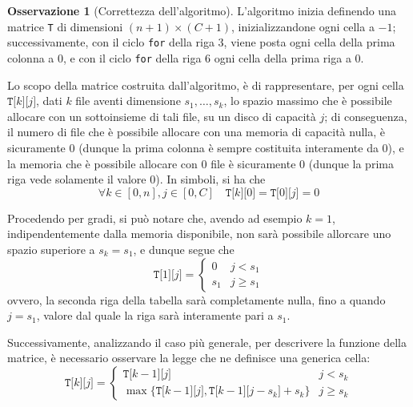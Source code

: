 \documentclass[14pt]{extreport}
\theoremstyle{definition}
\theoremstyle{definition}
\newtheorem{remark}{Osservazione}[subsection]
\begin{document}
\begin{remark}[Correttezza dell'algoritmo]
    L'algoritmo inizia definendo una matrice \texttt{T} di dimensioni $(n + 1) \times (C + 1)$, inizializzandone ogni cella a $-1$; successivamente, con il ciclo \texttt{for} della riga 3, viene posta ogni cella della prima colonna a 0, e con il ciclo \texttt{for} della riga 6 ogni cella della prima riga a 0.

    Lo scopo della matrice costruita dall'algoritmo, è di rappresentare, per ogni cella $\texttt{T[}k\texttt{][}j\texttt{]}$, dati $k$ file aventi dimensione $s_1, \ldots, s_k$, lo spazio massimo che è possibile allocare con un sottoinsieme di tali file, su un disco di capacità $j$; di conseguenza, il numero di file che è possibile allocare con una memoria di capacità nulla, è sicuramente 0 (dunque la prima colonna è sempre costituita interamente da 0), e la memoria che è possibile allocare con 0 file è sicuramente 0 (dunque la prima riga vede solamente il valore 0). In simboli, si ha che $$\forall k \in [0, n], j \in [0, C] \quad \texttt{T[}k\texttt{][}0\texttt{]} = \texttt{T[}0\texttt{][}j\texttt{]} = 0$$

    Procedendo per gradi, si può notare che, avendo ad esempio $k = 1$, indipendentemente dalla memoria disponibile, non sarà possibile allorcare uno spazio superiore a $s_k = s_1$, e dunque segue che $$\texttt{T[}1\texttt{][}j\texttt{]}= \left \{ \begin{array}{ll} 0 & j < s_1 \\ s_1 & j \ge s_1 \end{array} \right.$$ ovvero, la seconda riga della tabella sarà completamente nulla, fino a quando $j = s_1$, valore dal quale la riga sarà interamente pari a $s_1$.

    Successivamente, analizzando il caso più generale, per descrivere la funzione della matrice, è necessario osservare la legge che ne definisce una generica cella: $$\texttt{T[}k\texttt{][}j\texttt{]}=\left \{ \begin{array}{ll}\texttt{T[}k - 1\texttt{][}j\texttt{]} & j < s_k \\ \max\{\texttt{T[}k - 1\texttt{][}j\texttt{]}, \texttt{T[}k-1\texttt{][}j - s_k\texttt{]} + s_k\} & j \ge s_k \end{array} \right.$$


\end{remark}
\end{document}
